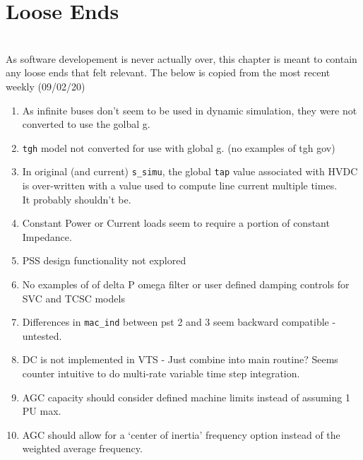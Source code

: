\chapter{Loose Ends} \ \\
As software developement is never actually over, this chapter is meant to contain any loose ends that felt relevant.
The below is copied from the most recent weekly (09/02/20)

	\begin{enumerate}
	\item As infinite buses don't seem to be used in dynamic simulation, they were not converted to use the golbal g.
		\item \verb|tgh| model not converted for use with global g. (no examples of tgh gov)
		\item In original (and current) \verb|s_simu|, the global \verb|tap| value associated with HVDC is over-written with  a value used to compute line current multiple times. \\It probably shouldn't be.
		\item Constant Power or Current loads seem to require a portion of constant Impedance.
		\item PSS design functionality not explored
		\item No examples of of delta P omega filter or user defined damping controls for SVC and TCSC models
		\item Differences in \verb|mac_ind| between pst 2 and 3 seem backward compatible - untested.
		\item DC is not implemented in VTS - Just combine into main routine? Seems counter intuitive to do multi-rate variable time step integration.
		\item AGC capacity should consider defined machine limits instead of assuming 1 PU max.
		\item AGC should allow for a `center of inertia' frequency option instead of the weighted average frequency.
	\end{enumerate}
	